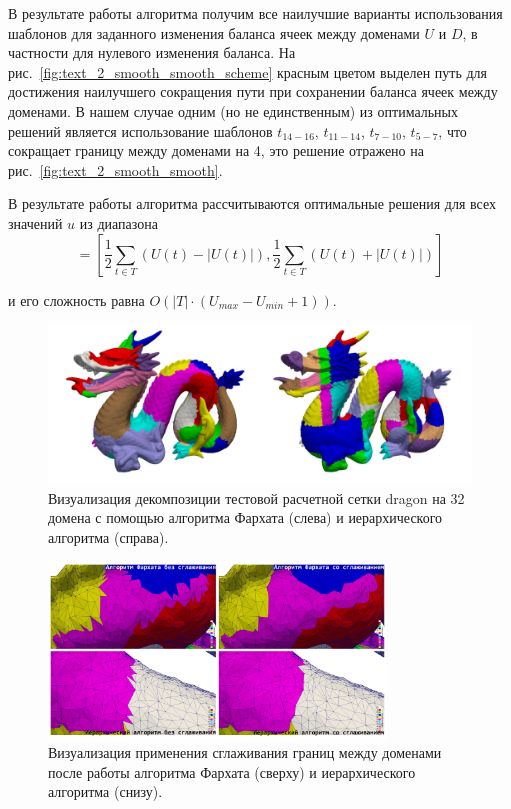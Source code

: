 В результате работы алгоритма получим все наилучшие варианты использования шаблонов для заданного изменения баланса ячеек между доменами $U$ и $D$, в частности для нулевого изменения баланса.
На рис.~\ref{fig:text_2_smooth_smooth_scheme} красным цветом выделен путь для достижения наилучшего сокращения пути при сохранении баланса ячеек между доменами.
В нашем случае одним (но не единственным) из оптимальных решений является использование шаблонов $t_{14-16}$, $t_{11-14}$, $t_{7-10}$, $t_{5-7}$, что сокращает границу между доменами на 4, это решение отражено на рис.~\ref{fig:text_2_smooth_smooth}.

В результате работы алгоритма рассчитываются оптимальные решения для всех значений $u$ из диапазона
\begin{equation}
	[U_{min}, U_{max}] = \left[ \frac{1}{2} \sum_{t \in T}{(U(t) - |U(t)|)}, \frac{1}{2} \sum_{t \in T}{(U(t) + |U(t)|)} \right]
\end{equation}

и его сложность равна $O \left( |T| \cdot (U_{max} - U_{min} + 1) \right)$.

\begin{figure}[ht]
\centering
\includegraphics[width=1.0\textwidth]{./pics/text_2_smooth/decomp.pdf}
\singlespacing
{}\caption{Визуализация декомпозиции тестовой расчетной сетки dragon на 32 домена с помощью алгоритма Фархата (слева) и иерархического алгоритма (справа).}
\label{fig:text_2_smooth_decomp}
\end{figure}

\begin{figure}[!ht]
\centering
\includegraphics[width=0.8\textwidth]{./pics/text_2_smooth/decomp2.pdf}
\singlespacing
{}\caption{Визуализация применения сглаживания границ между доменами после работы алгоритма Фархата (сверху) и иерархического алгоритма (снизу).}
\label{fig:text_2_smooth_decomp2}
\end{figure}

